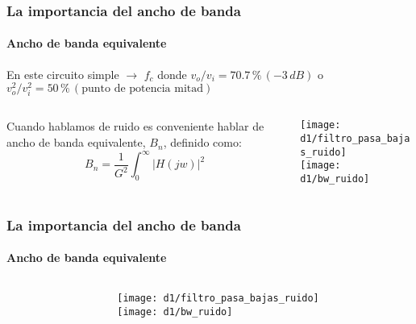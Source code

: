 \documentclass{beamer}
\begin{document}
\begin{frame}
\frametitle{La importancia del ancho de banda}
\framesubtitle{Ancho de banda equivalente}
En este circuito simple $\rightarrow$ $f_c$ donde
$v_o/v_i = 70.7\,\%\,(-3\,dB)$ o $v_o^2/v_i^2 = 50\,\%\,(\text{punto de potencia
mitad})$

\begin{columns}
\begin{column}{0.5\textwidth}
Cuando hablamos de ruido es conveniente hablar de ancho de banda equivalente,
$B_n$, definido como:
$$B_n = \frac{1}{G^2}\int_{0}^{\infty}{|H(jw)|^2}$$

\end{column}
\begin{column}{0.5\textwidth}
\begin{center}
\texttt{[image: d1/filtro\_pasa\_bajas\_ruido]} \\
\texttt{[image: d1/bw\_ruido]}
\end{center}
\end{column}
\end{columns}
\end{frame} 

\begin{frame}
\frametitle{La importancia del ancho de banda}
\framesubtitle{Ancho de banda equivalente}
\begin{columns}
\begin{column}{0.5\textwidth}
\end{column}
\begin{column}{0.5\textwidth}
\begin{center}
\texttt{[image: d1/filtro\_pasa\_bajas\_ruido]} \\
\texttt{[image: d1/bw\_ruido]}
\end{center}
\end{column}
\end{columns}
\end{frame} 
\end{document}

